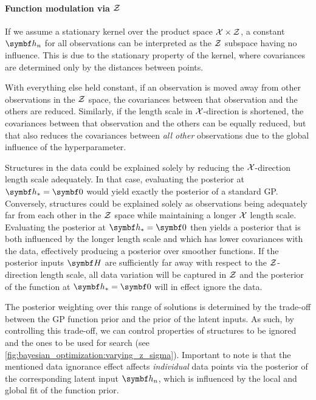 
\paragraph{Function modulation via $\mathcal{Z}$}
If we assume a stationary kernel over the product space $\mathcal{X} \times \mathcal{Z}$, a constant $\mat{h}_n$ for all observations can be interpreted as the $\mathcal{Z}$ subspace having no influence.
This is due to the stationary property of the kernel, where covariances are determined only by the distances between points.

With everything else held constant, if an observation is moved away from other observations in the $\mathcal{Z}$ space, the covariances between that observation and the others are reduced.
Similarly, if the length scale in $\mathcal{X}$-direction is shortened, the covariances between that observation and the others can be equally reduced, but that also reduces the covariances between \emph{all other} observations due to the global influence of the hyperparameter.

Structures in the data could be explained solely by reducing the $\mathcal{X}$-direction length scale adequately.
In that case, evaluating the posterior at $\mat{h}_\ast = \mat{0}$ would yield exactly the posterior of a standard GP.
Conversely, structures could be explained solely as observations being adequately far from each other in the $\mathcal{Z}$ space while maintaining a longer $\mathcal{X}$ length scale.
Evaluating the posterior at $\mat{h}_\ast = \mat{0}$ then yields a posterior that is both influenced by the longer length scale and which has lower covariances with the data, effectively producing a posterior over smoother functions.
If the posterior inputs $\mat{H}$ are sufficiently far away with respect to the $\mathcal{Z}$-direction length scale,
all data variation will be captured in $\mathcal{Z}$ and the posterior of the function at $\mat{h}_\ast = \mat{0}$ will in effect ignore the data.

The posterior weighting over this range of solutions is determined by the trade-off between the GP function prior and the prior of the latent inputs.
As such, by controlling this trade-off, we can control properties of structures to be ignored and the ones to be used for search (see \cref{fig:bayesian_optimization:varying_z_sigma}).
Important to note is that the mentioned data ignorance effect affects \emph{individual} data points via the posterior of the corresponding latent input $\mat{h}_n$,
which is influenced by the local and global fit of the function prior.

